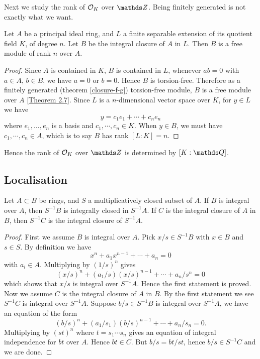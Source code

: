 			Next we study the rank of $\mathcal{O}_K$ over $\Z$. Being finitely generated is not exactly what we want.
			
			\begin{theorem}
				Let $A$ be a principal ideal ring, and $L$ a finite separable extension of its quotient field $K$, of degree $n$. Let $B$ be the integral closure of $A$ in $L$. Then $B$ is a free module of rank $n$ over $A$. 
			\end{theorem}
		
			\begin{proof}
				Since $A$ is contained in $K$, $B$ is contained in $L$, whenever $ab=0$ with $a \in A$, $b \in B$, we have $a=0$ or $b=0$. Hence $B$ is torsion-free. Therefore as a finitely generated (theorem \ref{closure-f-g}) torsion-free module, $B$ is a free module over $A$ \href{http://du.ac.in/du/uploads/departments/mathematics/study-material/MMATH18-201\%20_MT_PID.pdf}{[Theorem 2.7]}. Since $L$ is a $n$-dimensional vector space over $K$, for $y \in L$ we have
				\[
					y = c_1e_1+\cdots+c_ne_n
				\]
				where $e_1,\dots,e_n$ is a basis and $c_1,\cdots,c_n \in K$. When $y \in B$, we must have $c_1,\cdots,c_n \in A$, which is to say $B$ has rank $[L:K]=n$.
			\end{proof}
			Hence the rank of $\mathcal{O}_K$ over $\Z$ is determined by $[K:\Q]$.
		
		\subsection{Localisation}
		
			\begin{theorem}\label{int-clo-loc}
				Let $A \subset B$ be rings, and $S$ a multiplicatively closed subset of $A$. If $B$ is integral over $A$, then $S^{-1}B$ is integrally closed in $S^{-1}A$. If $C$ is the integral closure of $A$ in $B$, then $S^{-1}C$ is the integral closure of $S^{-1}A$. 
			\end{theorem}
		
			\begin{proof}
				First we assume $B$ is integral over $A$. Pick $x/s \in S^{-1}B$ with $x \in B$ and $s \in S$. By definition we have
				\[
					x^n + a_1x^{n-1}+\cdots + a_n = 0
				\]
				with $a_i \in A$. Multiplying by $(1/s)^n$ gives
				\[
					(x/s)^n + (a_1/s)(x/s)^{n-1}+\cdots+a_n/s^n = 0
				\]
				which shows that $x/s$ is integral over $S^{-1}A$. Hence the first statement is proved. \\
				Now we assume $C$ is the integral closure of $A$ in $B$. By the first statement we see $S^{-1}C$ is integral over $S^{-1}A$. Suppose $b/s \in S^{-1}B$ is integral over $S^{-1}A$, we have an equation of the form
				\[
					(b/s)^n+(a_1/s_1)(b/s)^{n-1}+\cdots+a_n/s_n=0.
				\]
				Multiplying by $(st)^n$ where $t=s_1\cdots s_n$ gives an equation of integral independence for $bt$ over $A$. Hence $bt \in C$. But $b/s = bt/st$, hence $b/s \in S^{-1}C$ and we are done. 
			\end{proof}
		
